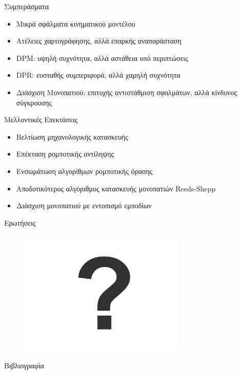 \documentclass[10pt, compress]{beamer}
\begin{document}
\begin{frame}{Συμπεράσματα}
	\begin{itemize}
		\item Μικρά σφάλματα κινηματικού μοντέλου
		\item Ατέλειες χαρτογράφησης, αλλά επαρκής αναπαράσταση
		\item DPM: υψηλή συχνότητα, αλλά αστάθεια υπό περιπτώσεις
		\item DPR: ευσταθής συμπεριφορά, αλλά χαμηλή συχνότητα
		\item Διάσχιση Μονοπατιού: επιτυχής αντιστάθμιση σφαλμάτων, αλλά κίνδυνος σύγκρουσης
	\end{itemize}
\end{frame}

\begin{frame}{Μελλοντικές Επεκτάσεις}
	\begin{itemize}
		\item Βελτίωση	μηχανολογικής κατασκευής
		\item Επέκταση ρομποτικής αντίληψης
		\item Ενσωμάτωση αλγορίθμων ρομποτικής όρασης
		\item Αποδοτικότερος αλγόριθμος κατασκευής μονοπατιών Reeds-Shepp
		\item Διάσχιση μονοπατιού με εντοπισμό εμποδίων
	\end{itemize}
\end{frame}

\begin{frame}{Ερωτήσεις}
	\begin{figure}
		\includegraphics[height=6cm]{Figures/question_mark.png}
	\end{figure}
\end{frame}

\begin{frame}[allowframebreaks]{Βιβλιογραφία}
	\nocite{*}
	\printbibliography
\end{frame}
\end{document}
